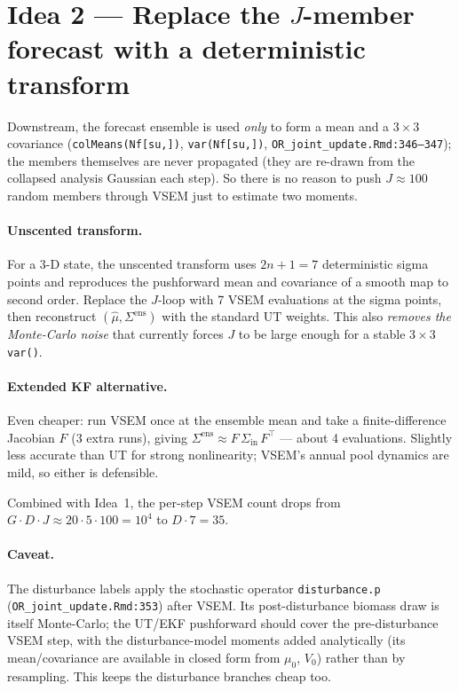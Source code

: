 \documentclass[11pt]{article}
\newcommand{\code}[1]{\texttt{#1}}
\begin{document}
\section{Idea 2 --- Replace the $J$-member forecast with a deterministic transform}
\label{sec:sigma}

Downstream, the forecast ensemble is used \emph{only} to form a mean and a $3\times3$
covariance (\code{colMeans(Nf[su,])}, \code{var(Nf[su,])},
\code{OR\_joint\_update.Rmd:346--347}); the members themselves are never propagated
(they are re-drawn from the collapsed analysis Gaussian each step). So there is no
reason to push $J\!\approx\!100$ random members through VSEM just to estimate two
moments.

\paragraph{Unscented transform.} For a 3-D state, the unscented transform uses
$2n+1=7$ deterministic sigma points and reproduces the pushforward mean and covariance
of a smooth map to second order. Replace the $J$-loop with 7 VSEM evaluations at the
sigma points, then reconstruct $(\hat\mu,\Sigma^{\text{ens}})$ with the standard UT
weights. This also \emph{removes the Monte-Carlo noise} that currently forces $J$ to be
large enough for a stable $3\times3$ \code{var()}.

\paragraph{Extended KF alternative.} Even cheaper: run VSEM once at the ensemble mean
and take a finite-difference Jacobian $F$ (3 extra runs), giving
$\Sigma^{\text{ens}} \approx F\,\Sigma_{\text{in}}\,F^\top$ --- about 4 evaluations.
Slightly less accurate than UT for strong nonlinearity; VSEM's annual pool dynamics are
mild, so either is defensible.

Combined with Idea~1, the per-step VSEM count drops from $G\cdot D\cdot J \approx
20\cdot5\cdot100 = 10^4$ to $D\cdot 7 = 35$.

\paragraph{Caveat.} The disturbance labels apply the stochastic operator
\code{disturbance.p} (\code{OR\_joint\_update.Rmd:353}) after VSEM. Its post-disturbance
biomass draw is itself Monte-Carlo; the UT/EKF pushforward should cover the pre-disturbance
VSEM step, with the disturbance-model moments added analytically (its mean/covariance are
available in closed form from $\mu_0$, $V_0$) rather than by resampling. This keeps the
disturbance branches cheap too.
\end{document}
